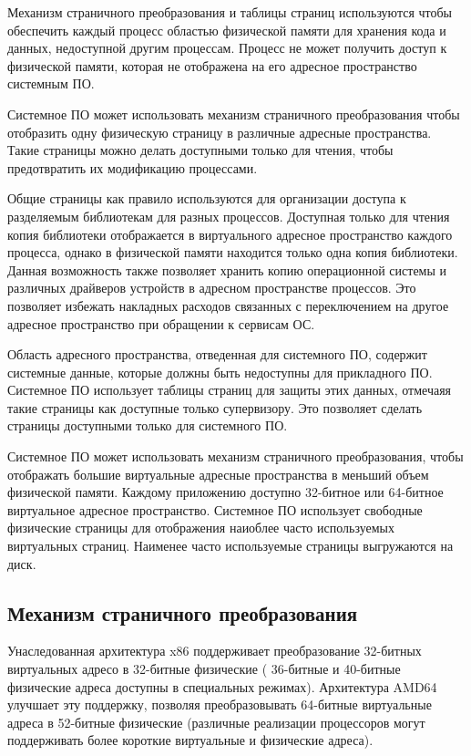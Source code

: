 Механизм страничного преобразования и таблицы страниц используются чтобы обеспечить
каждый процесс областью физической памяти для хранения кода и данных, недоступной другим процессам.
Процесс не может получить доступ к физической памяти, которая не отображена на его адресное
пространство системным ПО.

Системное ПО может использовать механизм страничного преобразования чтобы отобразить одну физическую
страницу в различные адресные пространства. Такие страницы можно делать доступными только для чтения,
чтобы предотвратить их модификацию процессами.

Общие страницы как правило используются для организации доступа к разделяемым библиотекам для
разных процессов. Доступная только для чтения копия библиотеки отображается в виртуального адресное
пространство каждого процесса, однако в физической памяти находится только одна копия библиотеки.
Данная возможность также позволяет хранить копию операционной системы и различных драйверов устройств
в адресном пространстве процессов. Это позволяет избежать накладных расходов связанных с переключением
на другое адресное пространство при обращении к сервисам ОС.

Область адресного пространства, отведенная для системного ПО, содержит системные данные, которые
должны быть недоступны для прикладного ПО. Системное ПО использует таблицы страниц для защиты этих
данных, отмечаяя такие страницы как доступные только супервизору. Это позволяет сделать страницы
доступными только для системного ПО.

Системное ПО может использовать механизм страничного преобразования, чтобы отображать большие
виртуальные адресные пространства в меньший объем физической памяти. Каждому приложению доступно
32-битное или 64-битное виртуальное адресное пространство. Системное ПО использует свободные
физические страницы для отображения наиоблее часто используемых виртуальных страниц. Наименее часто
используемые страницы выгружаются на диск.

\subsection{Механизм страничного преобразования}
Унаследованная архитектура x86 поддерживает преобразование 32-битных виртуальных адресо в 32-битные физические (
36-битные и 40-битные физические адреса доступны в специальных режимах). Архитектура AMD64 улучшает эту поддержку,
позволяя преобразовывать 64-битные виртуальные адреса в 52-битные физические (различные реализации процессоров
могут поддерживать более короткие виртуальные и физические адреса).

